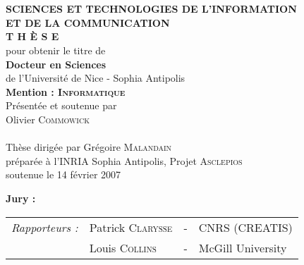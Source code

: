 \begin{titlepage}
\begin{center}
 \\
\vspace*{0.3cm}
 \\
\noindent \textbf{SCIENCES ET TECHNOLOGIES DE L'INFORMATION \\ ET DE LA COMMUNICATION} \\
\vspace*{0.5cm}
\noindent \Huge \textbf{T H È S E} \\
\vspace*{0.3cm}
\noindent \large {pour obtenir le titre de} \\
\vspace*{0.3cm}
\noindent \LARGE \textbf{Docteur en Sciences} \\
\vspace*{0.3cm}
\noindent \Large de l'Université de Nice - Sophia Antipolis \\
\noindent \Large \textbf{Mention : \textsc{Informatique}}\\
\vspace*{0.4cm}
\noindent \large {Présentée et soutenue par\\}
\noindent \LARGE Olivier \textsc{Commowick} \\
\vspace*{0.8cm}
 \\
\vspace*{0.8cm}
\noindent \Large Thèse dirigée par Grégoire \textsc{Malandain} \\
\vspace*{0.2cm}
\noindent \Large préparée à l'INRIA Sophia Antipolis, Projet \textsc{Asclepios} \\
\vspace*{0.2cm}
\noindent \large soutenue le 14 février 2007 \\
\vspace*{0.5cm}
\end{center}
\noindent \large \textbf{Jury :} \\
\begin{center}
\noindent \large 
\begin{tabular}{llcl}
      \textit{Rapporteurs :}	& Patrick \textsc{Clarysse}		& - & CNRS (CREATIS)\\
				& Louis \textsc{Collins}		& - & McGill University\\

\end{tabular}
\end{center}
\end{titlepage}

